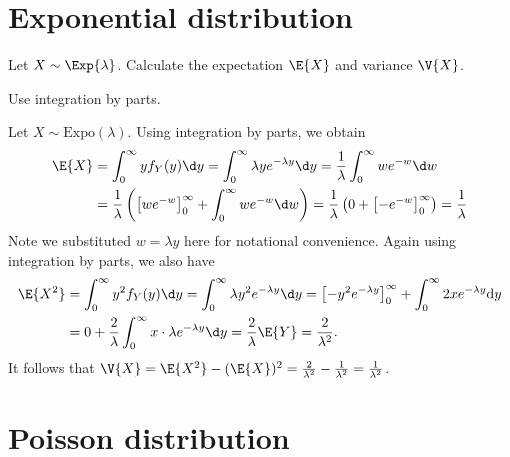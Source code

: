 \section{Exponential distribution}
\label{sec:section-5.7}
	
	\begin{exercise}\label{ex:chap05:01}
		Let $X \sim \Exp{\lambda}$. Calculate the expectation $\E{X}$ and variance $\V{X}$.
		\begin{hint}
			Use integration by parts.
		\end{hint}
		\begin{solution}
			Let $X \sim \text{Expo} (\lambda)$. Using integration by parts, we obtain
			\begin{align*}
				\E{X} & = \int_0^{\infty} y f_Y(y) \d y = \int_0^{\infty} \lambda y e^{- \lambda y} \d y = \frac{1}{\lambda} \int_0^{\infty} w e^{- w} \d w \\
				& = \frac{1}{\lambda} \left(\left[w e^{- w}\right]_0^{\infty} +\int_0^{\infty} w e^{- w} \d w\right) = \frac{1}{\lambda} \left(0 + \left[-e^{- w} \right]_0^{\infty}\right) = \frac{1}{\lambda}
			\end{align*}
			Note we substituted $w = \lambda y$ here for notational convenience. Again using integration by parts, we also have
			\begin{align*}
				\E{X^2} & = \int_0^{\infty} y^2 f_Y(y) \d y = \int_0^{\infty} \lambda y^2 e^{- \lambda y} \d y = \left[-y^2 e^{- \lambda y}\right]_0^{\infty} + \int_0^{\infty} 2x e^{- \lambda y} \mathrm{d}y \\
				& = 0 + \frac{2}{\lambda} \int_0^{\infty} x \cdot \lambda e^{- \lambda y} \d y = \frac{2}{\lambda} \E{Y} = \frac{2}{\lambda^2}.
			\end{align*}
			It follows that $\V{X} = \E{X^2} - (\E{X})^2 = \frac{2}{\lambda^2} - \frac{1}{\lambda^2} = \frac{1}{\lambda^2}$.
		\end{solution}
	\end{exercise}

\section{Poisson distribution}
\label{sec:section-5.8}
	
